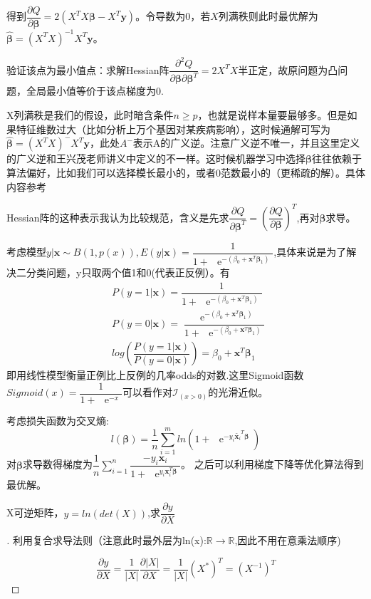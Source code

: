 \documentclass[cn,hazy,green,12pt,normal]{elegantnote}
\DeclareMathOperator{\e}{\!\!\;\mathrm e}
\newcommand{\p}{\partial}
\newcommand{\MR}{\mathbb R}
\numberwithin{equation}{section}
\numberwithin{subsection}{section}
\begin{document}
得到$\dfrac{\p Q}{\p \bm \beta}=2(X^TX \bm \beta-X^T\bm y)$。令导数为0，若$X$列满秩则此时最优解为$\hat{\bm \beta}=(X^TX)^{-1}X^T\bm y$。

验证该点为最小值点：求解Hessian阵$\dfrac{\p^2 Q}{\p \bm\beta \p \bm\beta^T}=2X^TX$半正定，故原问题为凸问题，全局最小值等价于该点梯度为0.

\begin{note}
    X列满秩是我们的假设，此时暗含条件$n \ge p$，也就是说样本量要最够多。但是如果特征维数过大（比如分析上万个基因对某疾病影响），这时候通解可写为$\hat{\bm \beta}=(X^TX)^- X^T\bm y$，此处$A^-$表示A的广义逆。注意广义逆不唯一，并且这里定义的广义逆和王兴茂老师讲义中定义的不一样。这时候机器学习中选择$\bm \beta$往往依赖于算法偏好，比如我们可以选择模长最小的，或者0范数最小的（更稀疏的解）。具体内容参考\cite{cn2}

    \noindent Hessian阵的这种表示我认为比较规范，含义是先求$\dfrac{\p Q}{\p \bm \beta^T}=(\dfrac{\p Q}{\p \bm \beta})^T$,再对$\bm \beta$求导。
\end{note}

\begin{example}
    考虑模型$y|\bm x\sim B(1,p(x)),E(y|\bm x)=\dfrac{1}{1+\e^{-(\beta_0+\bm x^T \bm \beta_1)}}$,具体来说是为了解决二分类问题，y只取两个值1和0(代表正反例）。有
\begin{align*}
        & P(y=1|\bm x)=\dfrac{1}{1+\e^{-(\beta_0+\bm x^T \bm \beta_1)}}\\
        & P(y=0|\bm x)=\dfrac{\e^{-(\beta_0+\bm x^T \bm \beta_1)}}{1+\e^{-(\beta_0+\bm x^T \bm \beta_1)}}\\
        & log(\dfrac{P(y=1|\bm x)}{P(y=0|\bm x)})=\beta_0+\bm x^T \bm \beta_1
\end{align*}
即用线性模型衡量正例比上反例的几率odds的对数.这里Sigmoid函数$Sigmoid(x)=\dfrac{1}{1+\e^{-x}}$可以看作对$\mathcal{I}_{(x>0)}$的光滑近似。

考虑损失函数为交叉熵:
\[
l(\bm \beta)=\frac{1}{n}\sum_{i=1}^m ln(1+\e^{-y_i\tilde{\bm x_i}^T\bm\beta})
\]
对$\bm\beta$求导数得梯度为$\dfrac{1}{n}\sum_{i=1}^n \dfrac{-y_i\bm x_i}{1+\e^{y_i\bm x_i ^T \bm\beta}}$。
之后可以利用梯度下降等优化算法得到最优解。
\end{example}
\begin{example}
    X可逆矩阵，$y = ln(det(X))$,求$\dfrac{\p y}{\p X}$
\end{example}

\begin{proof}[\solutionname]
    利用复合求导法则（注意此时最外层为ln(x):$\MR \rightarrow \MR$,因此不用在意乘法顺序)

\[
\dfrac{\p y}{\p X} = \dfrac{1}{|X|} \dfrac{\p |X|}{\p X}=\dfrac{1}{|X|} (X^*)^T=(X^{-1})^T
\]
\end{proof}
\printbibliography[heading=bibintoc, title=\ebibname]
\end{document}
